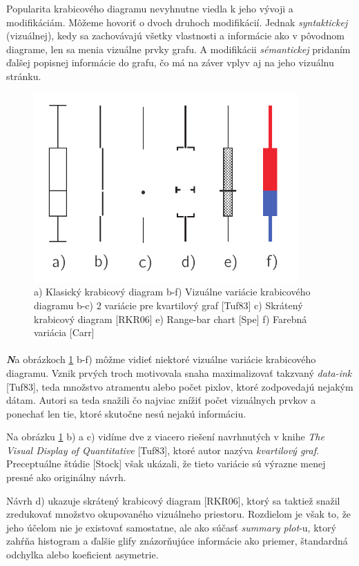 Popularita krabicového diagramu nevyhnutne viedla k jeho vývoji a modifikáciám. Môžeme hovoriť o dvoch druhoch modifikácií. Jednak \textit{syntaktickej} (vizuálnej), kedy sa zachovávajú všetky vlastnosti a informácie ako v pôvodnom diagrame, len sa menia vizuálne prvky grafu. A modifikácii \textit{sémantickej} pridaním ďalšej popisnej informácie do grafu, čo má na záver vplyv aj na jeho vizuálnu stránku.


\begin{figure}
	\centering
	\includegraphics[width = 4in]{boxplot2}
	\caption{ a) Klasický krabicový diagram  b-f) Vizuálne variácie krabicového diagramu b-c) 2 variácie pre kvartilový graf [Tuf83] c) Skrátený krabicový diagram [RKR06] e) Range-bar chart [Spe] f) Farebná variácia [Carr]  }
	\label{fig:boxplotmodif1}
\end{figure}


\paragraph{}
{\large \textbf{\textit{N}}}a obrázkoch \ref{fig:boxplotmodif1} b-f) môžme vidieť niektoré vizuálne variácie krabicového diagramu. Vznik prvých troch motivovala snaha maximalizovať takzvaný \textit{data-ink} [Tuf83], teda množstvo atramentu alebo počet pixlov, ktoré zodpovedajú nejakým dátam. Autori sa teda snažili čo najviac znížiť počet vizuálnych prvkov a ponechať len tie, ktoré skutočne nesú nejakú informáciu. 

Na obrázku \ref{fig:boxplotmodif1} b) a c) vidíme dve z viacero riešení navrhnutých v knihe \textit{The Visual Display of Quantitative} [Tuf83], ktoré autor nazýva \textit{kvartilový graf}. Preceptuálne štúdie [Stock] však ukázali, že tieto variácie sú výrazne menej presné ako originálny návrh.

Návrh d) ukazuje skrátený krabicový diagram [RKR06], ktorý sa taktiež snažil zredukovať množstvo okupovaného vizuálneho priestoru. Rozdielom je však to, že jeho účelom nie je existovať samostatne, ale ako súčasť \textit{summary plot}-u, ktorý zahŕňa histogram a ďalšie glify znázorňujúce informácie ako priemer, štandardná odchylka alebo koeficient asymetrie.

